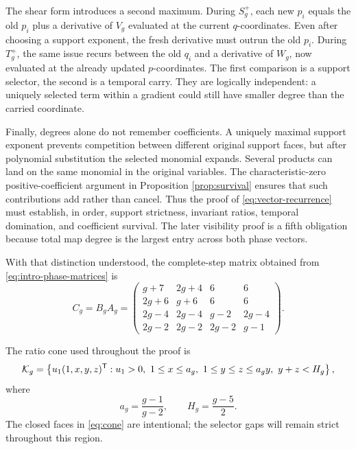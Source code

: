 \documentclass[11pt]{article}
\theoremstyle{remark}
\numberwithin{equation}{section}
\begin{document}
The shear form introduces a second maximum.  During \(S_g^+\), each
new \(p_i\) equals the old \(p_i\) plus a derivative of \(V_g\) evaluated at
the current \(q\)-coordinates.  Even after choosing a support exponent, the
fresh derivative must outrun the old \(p_i\).  During \(T_g^+\), the same
issue recurs between the old \(q_i\) and a derivative of \(W_g\), now
evaluated at the already updated \(p\)-coordinates.  The first comparison
is a support selector, the second is a temporal carry.  They are logically
independent: a uniquely selected term within a gradient could still have
smaller degree than the carried coordinate.

Finally, degrees alone do not remember coefficients.  A uniquely maximal
support exponent prevents competition between different original support
faces, but after polynomial substitution the selected monomial expands.
Several products can land on the same monomial in the original variables.
The characteristic-zero positive-coefficient argument in Proposition
\ref{prop:survival} ensures that such contributions add rather than cancel.
Thus the proof of \eqref{eq:vector-recurrence} must establish, in order,
support strictness, invariant ratios, temporal domination, and coefficient
survival.  The later visibility proof is a fifth obligation because total
map degree is the largest entry across both phase vectors.

\noindent
With that distinction understood, the complete-step matrix obtained from
\eqref{eq:intro-phase-matrices} is
\begin{equation}\label{eq:C}
C_g=B_gA_g=
\begin{pmatrix}
g+7&2g+4&6&6\\
2g+6&g+6&6&6\\
2g-4&2g-4&g-2&2g-4\\
2g-2&2g-2&2g-2&g-1
\end{pmatrix}.
\end{equation}

The ratio cone used throughout the proof is
\begin{equation}\label{eq:cone}
\mathcal K_g=\left\{
u_1(1,x,y,z)^{\transpose}:
u_1>0,\ 
1\leq x\leq a_g,\ 
1\leq y\leq z\leq a_gy,\ 
y+z<H_g
\right\},
\end{equation}
where
\begin{equation}\label{eq:a-h}
a_g=\frac{g-1}{g-2},
\qquad
H_g=\frac{g-5}{2}.
\end{equation}
The closed faces in \eqref{eq:cone} are intentional; the selector gaps will
remain strict throughout this region.
\end{document}
